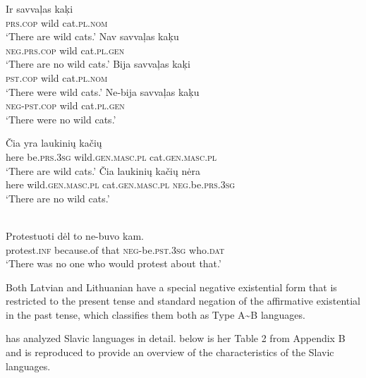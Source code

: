 ﻿\documentclass[output=paper]{langsci/langscibook}
\begin{document}
\begin{exe}\ex
{}
\begin{xlist}
\ex \gll Ir savvaļas  kaķi \\
\textsc{prs.cop} wild cat.\textsc{pl.nom} \\
    \glt `There are wild cats.'
\ex\label{ex:ieur-latvian-nowildcatsnow}
\gll Nav savvaļas kaķu\\
\textsc{neg.prs.cop} wild cat.\textsc{pl.gen}\\
    \glt `There are no wild cats.'
\ex
\gll Bija      savvaļas kaķi\\
\textsc{pst.cop} wild cat.\textsc{pl.nom}\\
    \glt `There were wild cats.'
\ex\label{ex:ieur-latvian-nowildcatspast}
\gll   Ne-bija savvaļas kaķu\\
\textsc{neg}-\textsc{pst}.\textsc{cop} wild cat.\textsc{pl}.\textsc{gen}\\
    \glt `There were no wild cats.'
\end{xlist}
\ex{}
\begin{xlist}
\ex\gll Čia yra laukinių kačių \\
here be.\textsc{prs.3sg} wild.\textsc{gen.masc.pl} cat.\textsc{gen.masc.pl}
\\
    \glt `There are wild cats.'
\ex\label{ex:ieur-lithuanian-nowildcatsnow}
\gll Čia  laukinių kačių nėra\\
here wild.\textsc{gen.masc.pl} cat.\textsc{gen.masc.pl}
\textsc{neg}.be.\textsc{prs.3sg}\\
    \glt `There are no wild cats.'
\end{xlist}
\ex\label{ex:ieur-lithuanian-noprotest}
\\
    \gll Protestuoti dėl to ne-buvo kam.  \\
protest.\textsc{inf} because.of that
\textsc{neg}-be.\textsc{pst.3sg} who.\textsc{dat}\\
    \glt `There was no one who would protest about that.' 
\end{exe}
%
Both Latvian and Lithuanian have a special negative existential form that is restricted to the present tense and standard negation of the affirmative existential in the past tense, which classifies them both as Type A{\textasciitilde}B languages. 

\citet{Veselinova2014} has analyzed Slavic languages in detail.
 below is her Table 2 from Appendix B and is reproduced to
provide an overview of the characteristics of the Slavic languages.
\end{document}
